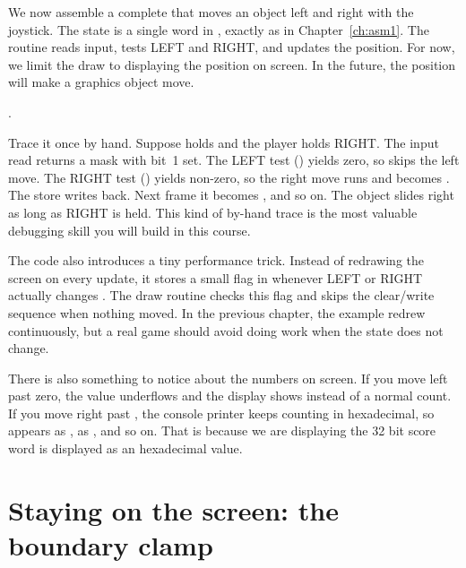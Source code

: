 We now assemble a complete  that moves an object left and right with
the joystick. The state is a single word in , exactly as in
Chapter~\ref{ch:asm1}. The routine reads input, tests LEFT and RIGHT, and updates
the position. For now, we limit the draw to displaying the position on screen.
In the future, the position will make a graphics object move.

\citep{prg32repo}.



Trace it once by hand. Suppose  holds  and the player
holds RIGHT. The input read returns a mask with bit~1 set. The LEFT test
() yields zero, so  skips the left move. The RIGHT
test () yields non-zero, so the right move runs and 
becomes . The store writes  back. Next frame it becomes
, and so on. The object slides right as long as RIGHT is held. This kind
of by-hand trace is the most valuable debugging skill you will build in this
course.

The code also introduces a tiny performance trick. Instead of redrawing the
screen on every update, it stores a small flag in  whenever
LEFT or RIGHT actually changes . The draw routine checks this
flag and skips the clear/write sequence when nothing moved. In the previous
chapter, the example redrew continuously, but a real game should avoid doing
work when the state does not change.

There is also something to notice about the numbers on screen. If you move
left past zero, the value underflows and the display shows  instead
of a normal count. If you move right past , the console printer keeps
counting in hexadecimal, so  appears as ,  as
, and so on. That is because we are displaying the 
32 bit score word is displayed as an hexadecimal value.

\section{Staying on the screen: the boundary clamp}

